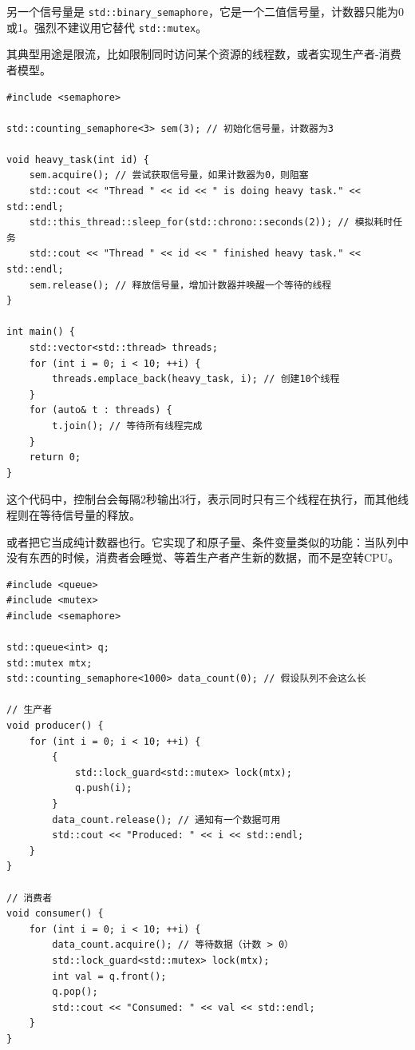另一个信号量是 \verb|std::binary_semaphore|，它是一个二值信号量，计数器只能为0或1。强烈不建议用它替代 \verb|std::mutex|。

其典型用途是限流，比如限制同时访问某个资源的线程数，或者实现生产者-消费者模型。

\begin{verbatim}
#include <semaphore>

std::counting_semaphore<3> sem(3); // 初始化信号量，计数器为3

void heavy_task(int id) {
    sem.acquire(); // 尝试获取信号量，如果计数器为0，则阻塞
    std::cout << "Thread " << id << " is doing heavy task." << std::endl;
    std::this_thread::sleep_for(std::chrono::seconds(2)); // 模拟耗时任务
    std::cout << "Thread " << id << " finished heavy task." << std::endl;
    sem.release(); // 释放信号量，增加计数器并唤醒一个等待的线程
}

int main() {
    std::vector<std::thread> threads;
    for (int i = 0; i < 10; ++i) {
        threads.emplace_back(heavy_task, i); // 创建10个线程
    }
    for (auto& t : threads) {
        t.join(); // 等待所有线程完成
    }
    return 0;
}
\end{verbatim}
这个代码中，控制台会每隔2秒输出3行，表示同时只有三个线程在执行，而其他线程则在等待信号量的释放。

或者把它当成纯计数器也行。它实现了和原子量、条件变量类似的功能：当队列中没有东西的时候，消费者会睡觉、等着生产者产生新的数据，而不是空转CPU。
\begin{verbatim}
#include <queue>
#include <mutex>
#include <semaphore>

std::queue<int> q;
std::mutex mtx;
std::counting_semaphore<1000> data_count(0); // 假设队列不会这么长

// 生产者
void producer() {
    for (int i = 0; i < 10; ++i) {
        {
            std::lock_guard<std::mutex> lock(mtx);
            q.push(i);
        }
        data_count.release(); // 通知有一个数据可用
        std::cout << "Produced: " << i << std::endl;
    }
}

// 消费者
void consumer() {
    for (int i = 0; i < 10; ++i) {
        data_count.acquire(); // 等待数据（计数 > 0）
        std::lock_guard<std::mutex> lock(mtx);
        int val = q.front();
        q.pop();
        std::cout << "Consumed: " << val << std::endl;
    }
}
\end{verbatim}

